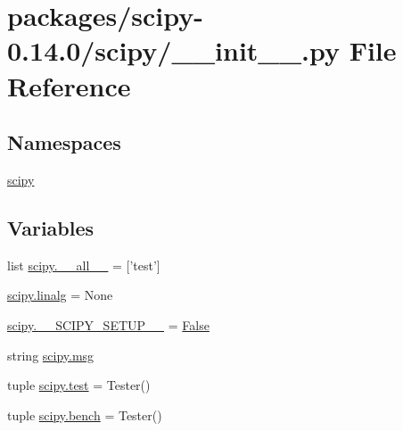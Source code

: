 \hypertarget{packages_2scipy-0_814_80_2scipy_2____init_____8py}{}\section{packages/scipy-\/0.14.0/scipy/\+\_\+\+\_\+init\+\_\+\+\_\+.py File Reference}
\label{packages_2scipy-0_814_80_2scipy_2____init_____8py}
\subsection*{Namespaces}
\begin{DoxyCompactItemize}
\item 
 \hyperlink{namespacescipy}{scipy}
\end{DoxyCompactItemize}
\subsection*{Variables}
\begin{DoxyCompactItemize}
\item 
list \hyperlink{namespacescipy_a384992e231bb8579e603ad53fd5ffbe7}{scipy.\+\_\+\+\_\+all\+\_\+\+\_\+} = \mbox{[}'test'\mbox{]}
\item 
\hyperlink{namespacescipy_a627dab68a298166ee420d3a6b1275963}{scipy.\+linalg} = None
\item 
\hyperlink{namespacescipy_a4a34452eeee824124cdc4a38f08dd61c}{scipy.\+\_\+\+\_\+\+S\+C\+I\+P\+Y\+\_\+\+S\+E\+T\+U\+P\+\_\+\+\_\+} = \hyperlink{libqhull_8h_a306ebd41c0cd1303b1372c6153f0caf8}{False}
\item 
string \hyperlink{namespacescipy_a66f2847a32f57566cf14418f8b8f90bf}{scipy.\+msg}
\item 
tuple \hyperlink{namespacescipy_a70e74008e7f71f6d1523b809c579467a}{scipy.\+test} = Tester()
\item 
tuple \hyperlink{namespacescipy_a278b283f6463f2f5cd2c9457135a8f47}{scipy.\+bench} = Tester()
\end{DoxyCompactItemize}
